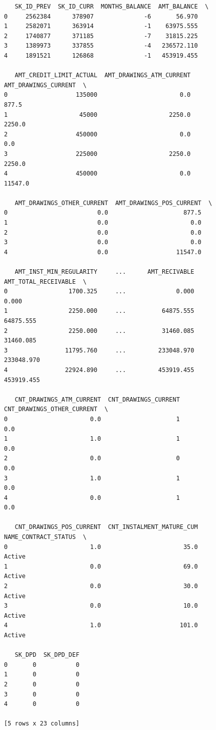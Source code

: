 \documentclass[11pt]{article}
\begin{document}
    
    \begin{verbatim}
   SK_ID_PREV  SK_ID_CURR  MONTHS_BALANCE  AMT_BALANCE  \
0     2562384      378907              -6       56.970   
1     2582071      363914              -1    63975.555   
2     1740877      371185              -7    31815.225   
3     1389973      337855              -4   236572.110   
4     1891521      126868              -1   453919.455   

   AMT_CREDIT_LIMIT_ACTUAL  AMT_DRAWINGS_ATM_CURRENT  AMT_DRAWINGS_CURRENT  \
0                   135000                       0.0                 877.5   
1                    45000                    2250.0                2250.0   
2                   450000                       0.0                   0.0   
3                   225000                    2250.0                2250.0   
4                   450000                       0.0               11547.0   

   AMT_DRAWINGS_OTHER_CURRENT  AMT_DRAWINGS_POS_CURRENT  \
0                         0.0                     877.5   
1                         0.0                       0.0   
2                         0.0                       0.0   
3                         0.0                       0.0   
4                         0.0                   11547.0   

   AMT_INST_MIN_REGULARITY     ...      AMT_RECIVABLE  AMT_TOTAL_RECEIVABLE  \
0                 1700.325     ...              0.000                 0.000   
1                 2250.000     ...          64875.555             64875.555   
2                 2250.000     ...          31460.085             31460.085   
3                11795.760     ...         233048.970            233048.970   
4                22924.890     ...         453919.455            453919.455   

   CNT_DRAWINGS_ATM_CURRENT  CNT_DRAWINGS_CURRENT  CNT_DRAWINGS_OTHER_CURRENT  \
0                       0.0                     1                         0.0   
1                       1.0                     1                         0.0   
2                       0.0                     0                         0.0   
3                       1.0                     1                         0.0   
4                       0.0                     1                         0.0   

   CNT_DRAWINGS_POS_CURRENT  CNT_INSTALMENT_MATURE_CUM  NAME_CONTRACT_STATUS  \
0                       1.0                       35.0                Active   
1                       0.0                       69.0                Active   
2                       0.0                       30.0                Active   
3                       0.0                       10.0                Active   
4                       1.0                      101.0                Active   

   SK_DPD  SK_DPD_DEF  
0       0           0  
1       0           0  
2       0           0  
3       0           0  
4       0           0  

[5 rows x 23 columns]
    \end{verbatim}
\end{document}
